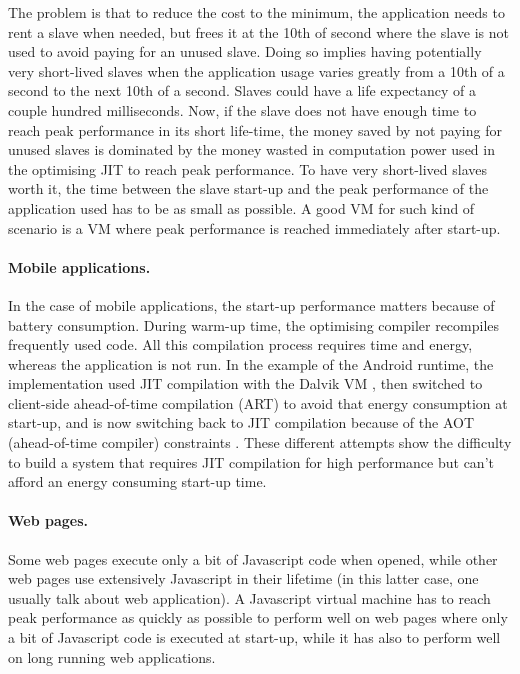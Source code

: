 \documentclass[a4paper,12pt,twoside]{../includes/ThesisStyle}
\begin{document}
The problem is that to reduce the cost to the minimum, the application needs to rent a slave when needed, but frees it at the 10th of second where the slave is not used to avoid paying for an unused slave. Doing so implies having potentially very short-lived slaves when the application usage varies greatly from a 10th of a second to the next 10th of a second. Slaves could have a life expectancy of a couple hundred milliseconds. Now, if the slave does not have enough time to reach peak performance in its short life-time, the money saved by not paying for unused slaves is dominated by the money wasted in computation power used in the optimising JIT to reach peak performance. To have very short-lived slaves worth it, the time between the slave start-up and the peak performance of the application used has to be as small as possible. A good VM for such kind of scenario is a VM where peak performance is reached immediately after start-up.

\paragraph{Mobile applications.}
In the case of mobile applications, the start-up performance matters because of battery consumption. During warm-up time, the optimising compiler recompiles frequently used code. All this compilation process requires time and energy, whereas the application is not run. In the example of the Android runtime, the implementation used JIT compilation with the Dalvik VM \cite{Born08a}, then switched to client-side ahead-of-time compilation (ART) to avoid that energy consumption at start-up, and is now switching back to JIT compilation because of the AOT (ahead-of-time compiler) constraints \cite{Geof15a}. These different attempts show the difficulty to build a system that requires JIT compilation for high performance but can't afford an energy consuming start-up time.

\paragraph{Web pages.}
Some web pages execute only a bit of Javascript code when opened, while other web pages use extensively Javascript in their lifetime (in this latter case, one usually talk about web application). A Javascript virtual machine has to reach peak performance as quickly as possible to perform well on web pages where only a bit of Javascript code is executed at start-up, while it has also to perform well on long running web applications.
\end{document}
